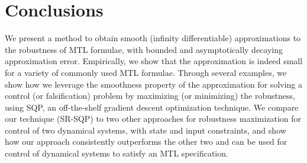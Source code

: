 \section{Conclusions}
We present a method to obtain smooth (infinity differentiable) approximations to the robustness of MTL formulae, with bounded and asymptotically decaying approximation error. 
Empirically, we show that the approximation is indeed small for a variety of commonly used MTL formulae. 
Through several examples, we show how we leverage the smoothness property of the approximation for solving a control (or falsification) problem by maximizing (or minimizing) the robustness, using SQP, an off-the-shelf gradient descent optimization technique. 
We compare our technique (SR-SQP) to two other approaches for robustness maximization for control of two dynamical systems, with state and input constraints, and show how our approach consistently outperforms the other two and can be used for control of dynamical systems to satisfy an MTL specification.

